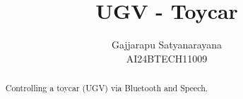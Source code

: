 \documentclass[conference]{IEEEtran}
\begin{document}

\title{ 
	\textbf{UGV - Toycar}
}
\author{Gajjarapu Satyanarayana \\ AI24BTECH11009}

\maketitle

\tableofcontents

\renewcommand{\thefigure}{\theenumi}
\renewcommand{\thetable}{\theenumi}

\bigskip

\begin{abstract}
Controlling a toycar (UGV) via Bluetooth and Speech.
\end{abstract}
\end{document}
